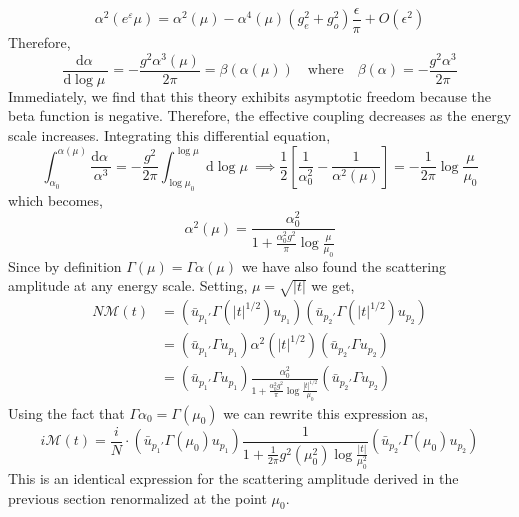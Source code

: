 \documentclass[12pt]{article}
\renewcommand{\d}[1]{ \mathrm{d}#1 \:}
\newcommand{\deriv}[2]{\frac{\d{#1}}{\d{#2}}}
\begin{document}
\[ \alpha^2(e^\varepsilon \mu) = \alpha^2(\mu) - \alpha^4(\mu) (g_e^2 + g_o^2) \frac{\epsilon}{\pi} + O(\epsilon^2) \] 
Therefore,
\[ \deriv{\alpha}{\log{\mu}} = -\frac{g^2 \alpha^3(\mu)}{2 \pi} = \beta(\alpha(\mu)) \quad \text{where} \quad \beta(\alpha) = -\frac{g^2 \alpha^3}{2 \pi} \]
Immediately, we find that this theory exhibits asymptotic freedom because the beta function is negative. Therefore, the effective coupling decreases as the energy scale increases. Integrating this differential equation,
\[ \int_{\alpha_0}^{\alpha(\mu)} \frac{\d{\alpha}}{\alpha^3} = -\frac{g^2}{2 \pi}\int_{\log{\mu_0}}^{\log{\mu}} \d{\log{\mu}} \implies \frac{1}{2} \left[ \frac{1}{\alpha_0^2} - \frac{1}{\alpha^2(\mu)} \right] = -\frac{1}{2 \pi} \log{\frac{\mu}{\mu_0}} \]
which becomes,
\[ \alpha^2(\mu) = \frac{\alpha_0^2}{1 + \frac{\alpha_0^2 g^2}{\pi} \log{\frac{\mu}{\mu_0}}} \]
Since by definition $\Gamma(\mu) = \Gamma \alpha(\mu)$ we have also found the scattering amplitude at any energy scale. Setting, $\mu = \sqrt{|t|}$ we get,
\begin{align*} N \mathcal{M}(t) 
& = ( \bar{u}_{p_1'} \Gamma(|t|^{1/2}) u_{p_1}) (\bar{u}_{p_2'} \Gamma(|t|^{1/2}) u_{p_2})
\\
& = ( \bar{u}_{p_1'} \Gamma u_{p_1}) \alpha^2(|t|^{1/2}) (\bar{u}_{p_2'} \Gamma u_{p_2}) 
\\
& = ( \bar{u}_{p_1'} \Gamma u_{p_1}) \frac{\alpha_0^2}{1 + \frac{\alpha_0^2 g^2}{\pi} \log{\frac{|t|^{1/2}}{\mu_0}}} (\bar{u}_{p_2'} \Gamma u_{p_2}) 
\end{align*}
Using the fact that $\Gamma \alpha_0 = \Gamma(\mu_0)$ we can rewrite this expression as,
\[ i \mathcal{M}(t) = \frac{i}{N} \cdot ( \bar{u}_{p_1'} \Gamma(\mu_0) u_{p_1}) \frac{1}{1 + \frac{1}{2 \pi} g^2(\mu_0^2) \log{\frac{|t|}{\mu_0^2}}} (\bar{u}_{p_2'} \Gamma(\mu_0) u_{p_2}) \]
This is an identical expression for the scattering amplitude derived in the previous section renormalized at the point $\mu_0$.
\end{document}
